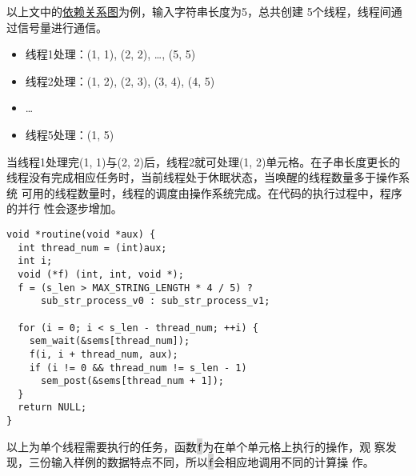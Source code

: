 \documentclass{ctexart}
\newcommand{\mdcode}[1]{\texttt{\colorbox{lightgray}{#1}}}
\begin{document}
以上文中的\hyperref[fig:dep]{依赖关系图}为例，输入字符串长度为5，总共创建
5个线程，线程间通过信号量进行通信。

\begin{itemize}  
  \item
    线程1处理：(1, 1), (2, 2), \ldots, (5, 5)
  \item
    线程2处理：(1, 2), (2, 3), (3, 4), (4, 5)
  \item
    \ldots
  \item
    线程5处理：(1, 5)
\end{itemize}

当线程1处理完(1, 1)与(2, 2)后，线程2就可处理(1, 2)单元格。在子串长度更长的
线程没有完成相应任务时，当前线程处于休眠状态，当唤醒的线程数量多于操作系统
可用的线程数量时，线程的调度由操作系统完成。在代码的执行过程中，程序的并行
性会逐步增加。

\begin{lstlisting}[caption={单个线程任务}, label={lst:routine}]
void *routine(void *aux) {
  int thread_num = (int)aux;
  int i;
  void (*f) (int, int, void *);
  f = (s_len > MAX_STRING_LENGTH * 4 / 5) ? 
      sub_str_process_v0 : sub_str_process_v1;

  for (i = 0; i < s_len - thread_num; ++i) {
    sem_wait(&sems[thread_num]);
    f(i, i + thread_num, aux);
    if (i != 0 && thread_num != s_len - 1)
      sem_post(&sems[thread_num + 1]);
  }
  return NULL;
}
\end{lstlisting}

以上为单个线程需要执行的任务，函数\mdcode{f}为在单个单元格上执行的操作，观
察发现，三份输入样例的数据特点不同，所以\mdcode{f}会相应地调用不同的计算操
作。
\end{document}
